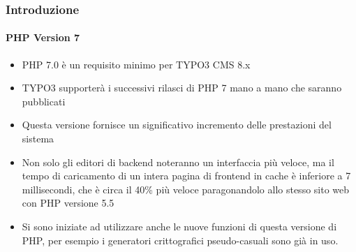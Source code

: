 \begin{frame}[fragile]
	\frametitle{Introduzione}
	\framesubtitle{PHP Version 7}

	\begin{itemize} 

		\item PHP 7.0 è un requisito minimo per TYPO3 CMS 8.x
		\item TYPO3 supporterà i successivi rilasci di PHP 7 mano a mano che saranno pubblicati
		\item Questa versione fornisce un significativo incremento delle prestazioni del sistema

		\item Non solo gli editori di backend noteranno un interfaccia più veloce, ma il tempo
			di caricamento di un intera pagina di frontend in cache è inferiore a
			7 millisecondi, che è circa il 40\% più veloce paragonandolo
			allo stesso sito web con PHP versione 5.5

		\item Si sono iniziate ad utilizzare anche le nuove funzioni di questa versione di PHP,
			per esempio i generatori crittografici pseudo-casuali sono già in uso.
			
	\end{itemize}

\end{frame}

